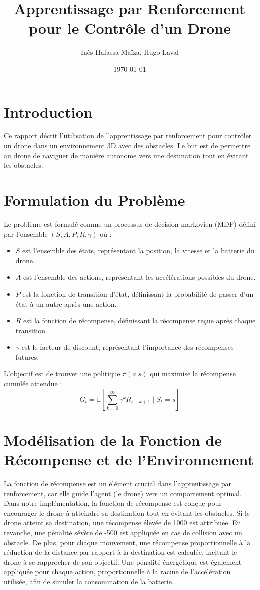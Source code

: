\documentclass[a4paper, 12pt]{article}
\title{Apprentissage par Renforcement pour le Contrôle d'un Drone}
\author{Inès Hafassa-Maïza, Hugo Laval}
\date{\today}
\begin{document}
\maketitle

\section{Introduction}
Ce rapport décrit l'utilisation de l'apprentissage par renforcement pour contrôler un drone dans un environnement 3D avec des obstacles. Le but est de permettre au drone de naviguer de manière autonome vers une destination tout en évitant les obstacles.

\section{Formulation du Problème}
Le problème est formulé comme un processus de décision markovien (MDP) défini par l'ensemble $(S, A, P, R, \gamma)$ où :
\begin{itemize}
    \item $S$ est l'ensemble des états, représentant la position, la vitesse et la batterie du drone.
    \item $A$ est l'ensemble des actions, représentant les accélérations possibles du drone.
    \item $P$ est la fonction de transition d'état, définissant la probabilité de passer d'un état à un autre après une action.
    \item $R$ est la fonction de récompense, définissant la récompense reçue après chaque transition.
    \item $\gamma$ est le facteur de discount, représentant l'importance des récompenses futures.
\end{itemize}

L'objectif est de trouver une politique $\pi(a|s)$ qui maximise la récompense cumulée attendue :
\[
G_t = \mathbb{E} \left[ \sum_{k=0}^{\infty} \gamma^k R_{t+k+1} \mid S_t = s \right]
\]

\section{Modélisation de la Fonction de Récompense et de l'Environnement}
La fonction de récompense est un élément crucial dans l'apprentissage par renforcement, car elle guide l'agent (le drone) vers un comportement optimal. Dans notre implémentation, la fonction de récompense est conçue pour encourager le drone à atteindre sa destination tout en évitant les obstacles. Si le drone atteint sa destination, une récompense élevée de 1000 est attribuée. En revanche, une pénalité sévère de -500 est appliquée en cas de collision avec un obstacle. De plus, pour chaque mouvement, une récompense proportionnelle à la réduction de la distance par rapport à la destination est calculée, incitant le drone à se rapprocher de son objectif. Une pénalité énergétique est également appliquée pour chaque action, proportionnelle à la racine de l'accélération utilisée, afin de simuler la consommation de la batterie.
\end{document}
